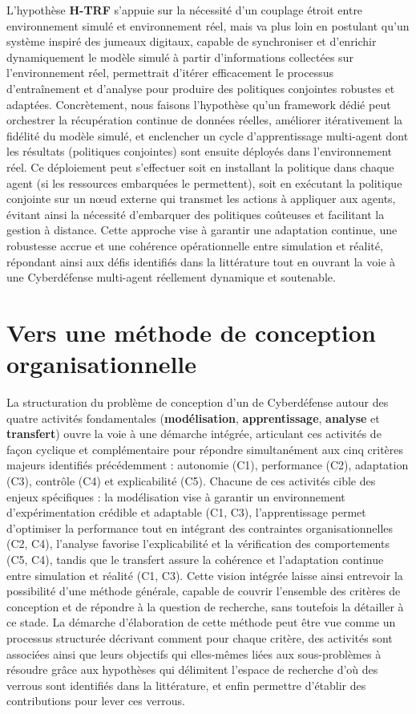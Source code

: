 \noindent L'hypothèse \textbf{H-TRF} s'appuie sur la nécessité d'un couplage étroit entre environnement simulé et environnement réel, mais va plus loin en postulant qu'un système inspiré des jumeaux digitaux, capable de synchroniser et d'enrichir dynamiquement le modèle simulé à partir d'informations collectées sur l'environnement réel, permettrait d'itérer efficacement le processus d'entraînement et d'analyse pour produire des politiques conjointes robustes et adaptées. Concrètement, nous faisons l'hypothèse qu'un framework dédié peut orchestrer la récupération continue de données réelles, améliorer itérativement la fidélité du modèle simulé, et enclencher un cycle d'apprentissage multi-agent dont les résultats (politiques conjointes) sont ensuite déployés dans l'environnement réel. Ce déploiement peut s'effectuer soit en installant la politique dans chaque agent (si les ressources embarquées le permettent), soit en exécutant la politique conjointe sur un nœud externe qui transmet les actions à appliquer aux agents, évitant ainsi la nécessité d'embarquer des politiques coûteuses et facilitant la gestion à distance. Cette approche vise à garantir une adaptation continue, une robustesse accrue et une cohérence opérationnelle entre simulation et réalité, répondant ainsi aux défis identifiés dans la littérature tout en ouvrant la voie à une Cyberdéfense multi-agent réellement dynamique et soutenable.



\section{Vers une méthode de conception organisationnelle}

La structuration du problème de conception d'un  de Cyberdéfense autour des quatre activités fondamentales (\textbf{modélisation}, \textbf{apprentissage}, \textbf{analyse} et \textbf{transfert}) ouvre la voie à une démarche intégrée, articulant ces activités de façon cyclique et complémentaire pour répondre simultanément aux cinq critères majeurs identifiés précédemment : autonomie (C1), performance (C2), adaptation (C3), contrôle (C4) et explicabilité (C5). Chacune de ces activités cible des enjeux spécifiques : la modélisation vise à garantir un environnement d'expérimentation crédible et adaptable (C1, C3), l'apprentissage permet d'optimiser la performance tout en intégrant des contraintes organisationnelles (C2, C4), l'analyse favorise l'explicabilité et la vérification des comportements (C5, C4), tandis que le transfert assure la cohérence et l'adaptation continue entre simulation et réalité (C1, C3).
%
Cette vision intégrée laisse ainsi entrevoir la possibilité d'une méthode générale, capable de couvrir l'ensemble des critères de conception et de répondre à la question de recherche, sans toutefois la détailler à ce stade. La démarche d'élaboration de cette méthode peut être vue comme un processus structurée décrivant comment pour chaque critère, des activités sont associées ainsi que leurs objectifs qui elles-mêmes liées aux sous-problèmes à résoudre grâce aux hypothèses qui délimitent l'espace de recherche d'où des verrous sont identifiés dans la littérature, et enfin permettre d'établir des contributions pour lever ces verrous.

